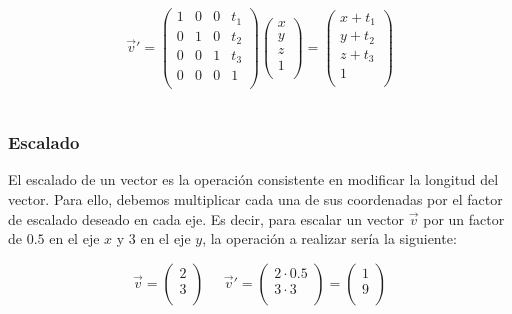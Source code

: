 \begin{equation}
	\label{eq:matrixtranslation}
	\overrightarrow{v}' = 
	\left( \begin{array}{cccc}
			1 & 0 & 0 & t_1 \\
			0 & 1 & 0 & t_2 \\
			0 & 0 & 1 & t_3 \\
			0 & 0 & 0 & 1 \\
	\end{array} \right)
	\left( \begin{array}{c}
			x \\
			y \\
			z \\
			1 \\
	\end{array} \right) = 
	\left( \begin{array}{c}
			x + t_1 \\
			y + t_2 \\
			z + t_3 \\
			1 \\
	\end{array} \right)
\end{equation}\\

\subsubsection{Escalado}
\label{makereference5.4.1.2}

El escalado de un vector es la operación consistente en modificar la longitud
del vector. Para ello, debemos multiplicar cada una de sus coordenadas por el
factor de escalado deseado en cada eje. Es decir, para escalar un vector
$\overrightarrow{v}$ por un factor de $0.5$ en el eje $x$ y $3$ en el eje $y$,
la operación a realizar sería la siguiente:

\begin{equation}
	\label{eq:scaling}
	\overrightarrow{v} = 
	\left( \begin{array}{c}
			2 \\
			3 \\
	\end{array} \right)
	\;\;\;\;\;
	\overrightarrow{v}' =
	\left( \begin{array}{c}
		2\cdot0.5 \\
		3\cdot3 \\
	\end{array}	\right) =  
	\left( \begin{array}{c}
			1 \\
			9 \\
	\end{array} \right)
\end{equation}\\

